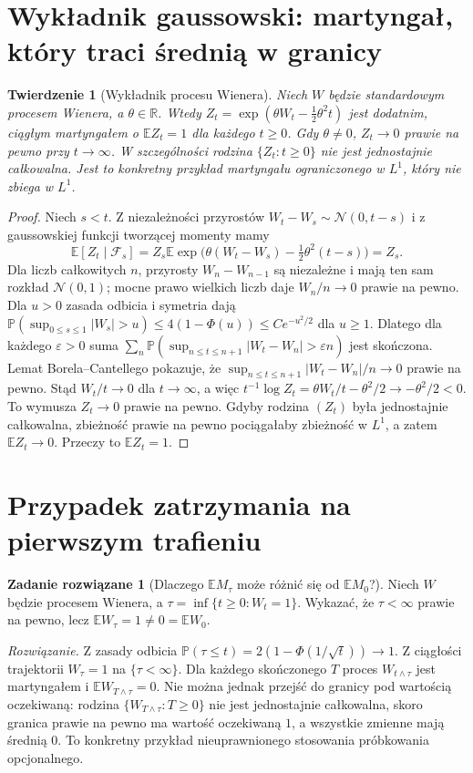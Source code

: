 \documentclass[11pt,a4paper,oneside]{report}
\numberwithin{equation}{chapter}
\theoremstyle{plain}
\newtheorem{twierdzenie}{Twierdzenie}[chapter]
\theoremstyle{definition}
\newtheorem{zadanie}{Zadanie rozwiązane}[chapter]
\theoremstyle{remark}
\newcommand{\R}{\mathbb{R}}
\newcommand{\Prob}{\mathbb{P}}
\newcommand{\E}{\mathbb{E}}
\newcommand{\calF}{\mathcal{F}}
\newcommand{\Normal}{\mathcal{N}}
\begin{document}
\section{Wykładnik gaussowski: martyngał, który traci średnią w granicy}
\begin{twierdzenie}[Wykładnik procesu Wienera]
Niech $W$ będzie standardowym procesem Wienera, a
$\theta\in\R$. Wtedy
$Z_t=\exp(\theta W_t-\tfrac12\theta^2t)$
jest dodatnim, ciągłym martyngałem o $\E Z_t=1$
dla każdego $t\ge0$. Gdy $\theta\ne0$,
$Z_t\to0$ prawie na pewno przy $t\to\infty$.
W szczególności rodzina $\{Z_t:t\ge0\}$ nie jest
jednostajnie całkowalna. Jest to konkretny przykład
martyngału ograniczonego w $L^1$, który nie zbiega w $L^1$.
\end{twierdzenie}
\begin{proof}
Niech $s<t$. Z niezależności przyrostów
$W_t-W_s\sim\Normal(0,t-s)$ i z gaussowskiej
funkcji tworzącej momenty mamy
\[
\E[Z_t\mid\calF_s]
=Z_s\E\exp\bigl(\theta(W_t-W_s)-\tfrac12\theta^2(t-s)\bigr)
=Z_s.
\]
Dla liczb całkowitych $n$, przyrosty
$W_n-W_{n-1}$ są niezależne i mają ten sam rozkład
$\Normal(0,1)$; mocne prawo wielkich liczb daje
$W_n/n\to0$ prawie na pewno.
Dla $u>0$ zasada odbicia i symetria dają
$\Prob(\sup_{0\le s\le1}|W_s|>u)\le
4(1-\Phi(u))\le C e^{-u^2/2}$ dla $u\ge1$.
Dlatego dla każdego $\varepsilon>0$ suma
$\sum_n\Prob(\sup_{n\le t\le n+1}|W_t-W_n|>\varepsilon n)$
jest skończona. Lemat Borela--Cantellego pokazuje, że
$\sup_{n\le t\le n+1}|W_t-W_n|/n\to0$ prawie na pewno.
Stąd $W_t/t\to0$ dla $t\to\infty$, a więc
$t^{-1}\log Z_t=\theta W_t/t-\theta^2/2\to-\theta^2/2<0$.
To wymusza $Z_t\to0$ prawie na pewno.
Gdyby rodzina $(Z_t)$ była jednostajnie całkowalna,
zbieżność prawie na pewno pociągałaby zbieżność w $L^1$,
a zatem $\E Z_t\to0$. Przeczy to $\E Z_t=1$.
\end{proof}

\section{Przypadek zatrzymania na pierwszym trafieniu}
\begin{zadanie}[Dlaczego $\E M_\tau$ może różnić się od $\E M_0$?]
Niech $W$ będzie procesem Wienera, a
$\tau=\inf\{t\ge0:W_t=1\}$. Wykazać, że
$\tau<\infty$ prawie na pewno, lecz
$\E W_\tau=1\ne0=\E W_0$.

\emph{Rozwiązanie.} Z zasady odbicia
$\Prob(\tau\le t)=2(1-\Phi(1/\sqrt t))\to1$.
Z ciągłości trajektorii $W_\tau=1$ na $\{\tau<\infty\}$.
Dla każdego skończonego $T$ proces $W_{t\wedge\tau}$
jest martyngałem i $\E W_{T\wedge\tau}=0$.
Nie można jednak przejść do granicy pod wartością oczekiwaną:
rodzina $\{W_{T\wedge\tau}:T\ge0\}$ nie jest
jednostajnie całkowalna, skoro granica prawie na pewno
ma wartość oczekiwaną $1$, a wszystkie zmienne mają
średnią $0$. To konkretny przykład nieuprawnionego
stosowania próbkowania opcjonalnego.
\end{zadanie}
\end{document}
